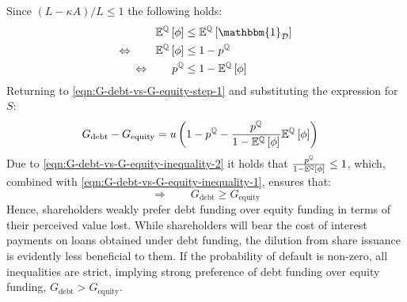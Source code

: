 \documentclass[../main.tex]{subfiles}
\begin{document}
        Since $(L-\kappa A) / L \leq 1$ the following holds:
            \begin{align}
                    \mathbb{E}^{\rnmeasure}\left[\phi\right]
                &\leq
                    \mathbb{E}^{\rnmeasure}\left[\mathbbm{1}_{\mathcal{D}} \right]
                \nonumber \\
                \Leftrightarrow 
                \qquad
                    \mathbb{E}^{\rnmeasure}\left[\phi\right]
                &\leq
                    1 - p^{\rnmeasure}
                \label{eqn:G-debt-vs-G-equity-inequality-1}
                \\
                \Leftrightarrow 
                \qquad
                p^{\rnmeasure}
                &\leq 
                1 - \mathbb{E}^{\rnmeasure}\left[\phi\right]
                \label{eqn:G-debt-vs-G-equity-inequality-2}
            \end{align}
        Returning to \cref{eqn:G-debt-vs-G-equity-step-1} and substituting the expression for $S$:
            \begin{align}
                G_{\text{debt}}
                -
                G_{\text{equity}}
                &=
                    u \left(
                        1
                        -
                        p^{\mathbb{Q}}
                        -
                        \frac{
                            p^{\mathbb{Q}}
                        }{
                            1
                            -
                            \mathbb{E}^{\mathbb{Q}}\left[\phi\right]
                        } 
                        \mathbb{E}^{\mathbb{Q}}\left[\phi\right]
                    \right)
                \nonumber
            \end{align}
        Due to \cref{eqn:G-debt-vs-G-equity-inequality-2} it holds that
        $\frac{p^{\mathbb{Q}}}{1-\mathbb{E}^{\mathbb{Q}}\left[\phi\right]} \leq 1$,
        which, combined with \cref{eqn:G-debt-vs-G-equity-inequality-1}, ensures that:
            \begin{equation}
                \Rightarrow 
                \qquad
                G_{\text{debt}}
                \geq 
                G_{\text{equity}}
                \label{eqn:G-debt-vs-G-equity}
            \end{equation}
        Hence, shareholders weakly prefer debt funding over equity funding in terms of their perceived value lost.
        While shareholders will bear the cost of interest payments on loans obtained under debt funding,
        the dilution from share issuance is evidently less beneficial to them. 
        If the probability of default is non-zero, all inequalities are strict,
        implying strong preference of debt funding over equity funding, $G_{\text{debt}} > G_{\text{equity}}$.
        
\end{document}
